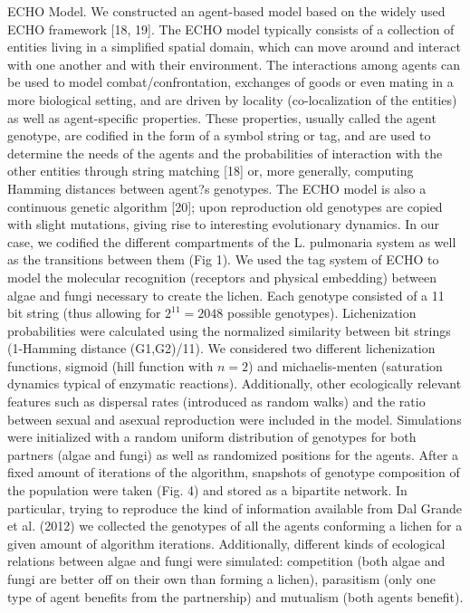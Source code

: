 \documentclass[runningheads,a4paper]{llncs}
\begin{document}
ECHO Model.
We constructed an agent-based model based on the widely used ECHO framework [18, 19]. The ECHO model typically consists of a collection of entities living in a simplified spatial domain, which can move around and interact with one another and with their environment. The interactions among agents can be used to model combat/confrontation, exchanges of goods or even mating in a more biological setting, and are driven by locality (co-localization of the entities) as well as agent-specific properties. These properties, usually called the agent genotype, are codified in the form of a symbol string or tag, and are used to determine the needs of the agents and the probabilities of interaction with the other entities through string matching [18] or, more generally, computing Hamming distances between agent?s genotypes. The ECHO model is also a continuous genetic algorithm  [20]; upon reproduction old genotypes are copied with slight mutations, giving rise to interesting evolutionary dynamics.
 In our case, we codified the different compartments of the L. pulmonaria system as well as the transitions between them (Fig 1). We used the tag system of ECHO to model the molecular recognition (receptors and physical embedding) between algae and fungi necessary to create the lichen. Each genotype consisted of a 11 bit string (thus allowing for $2^11=2048$ possible genotypes). Lichenization probabilities were calculated using the normalized similarity between bit strings (1-Hamming distance (G1,G2)/11). We considered two different lichenization functions, sigmoid (hill function with $n=2$) and michaelis-menten (saturation dynamics typical of enzymatic reactions). Additionally, other ecologically relevant features such as dispersal rates (introduced as random walks) and the ratio between sexual and asexual reproduction were included in the model. 
Simulations were initialized with a random uniform distribution of genotypes for both partners (algae and fungi) as well as randomized positions for the agents. After a fixed amount of iterations of the algorithm, snapshots of genotype composition of the population were taken (Fig. 4) and stored as a bipartite network. In particular, trying to reproduce the kind of information available from Dal Grande et al. (2012) we collected the genotypes of all the agents conforming a lichen for a given amount of algorithm iterations. Additionally, different kinds of ecological relations between algae and fungi were simulated: competition (both algae and fungi are better off on their own than forming a lichen), parasitism (only one type of agent benefits from the partnership) and mutualism (both agents benefit).
\end{document}
